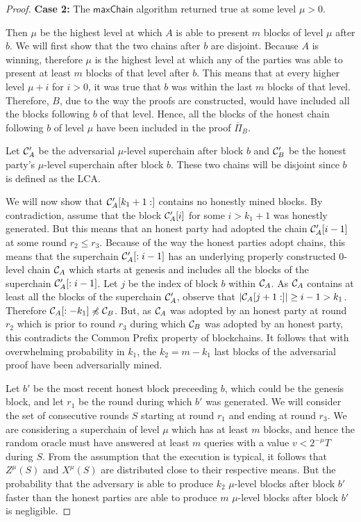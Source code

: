 \begin{proof}
    \textbf{Case 2:} The $\textsf{maxChain}$ algorithm returned true at some
    level $\mu > 0$.

    Then $\mu$ be the highest level at which $A$ is able to present $m$ blocks
    of level $\mu$ after $b$. We will first show that the two chains after $b$
    are disjoint. Because $A$ is winning, therefore $\mu$ is the highest level
    at which any of the parties was able to present at least $m$ blocks of that
    level after $b$.  This means that at every higher level $\mu + i$ for $i >
    0$, it was true that $b$ was within the last $m$ blocks of that level.
    Therefore, $B$, due to the way the proofs are constructed, would have
    included all the blocks following $b$ of that level. Hence, all the blocks
    of the honest chain following $b$ of level $\mu$ have been included in the
    proof $\overline{\Pi}_B$.

    Let $\mathcal{C}'_A$ be the adversarial $\mu$-level superchain after block $b$
    and $\mathcal{C}'_B$ be the honest party's $\mu$-level superchain after block
    $b$.  These two chains will be disjoint since $b$ is defined as the LCA.

    We will now show that $\mathcal{C}'_A[k_1 + 1:]$ contains no honestly mined
    blocks. By contradiction, assume that the block $\mathcal{C}'_A[i]$ for some $i
    > k_1 + 1$ was honestly generated. But this means that an honest party had
    adopted the chain $\mathcal{C}'_A[i - 1]$ at some round $r_2 \leq r_3$. Because
    of the way the honest parties adopt chains, this means that the superchain
    $\mathcal{C}'_A[:i - 1]$ has an underlying properly constructed $0$-level chain
    $\mathcal{C}_A$ which starts at genesis and includes all the blocks of the
    superchain $\mathcal{C}'_A[:i - 1]$. Let $j$ be the index of block $b$ within
    $\mathcal{C}_A$.  As $\mathcal{C}_A$ contains at least all the blocks of the
    superchain $\mathcal{C}'_A$, observe that $|\mathcal{C}_A[j + 1:]| \geq i - 1 > k_1$.
    Therefore $\mathcal{C}_A[:-k_1] \not\preccurlyeq \mathcal{C}_B$. But, as $\mathcal{C}_A$
    was adopted by an honest party at round $r_2$ which is prior to round $r_3$
    during which $\mathcal{C}_B$ was adopted by an honest party, this contradicts
    the Common Prefix property of blockchains. It follows that with
    overwhelming probability in $k_1$, the $k_2 = m - k_1$ last blocks of the
    adversarial proof have been adversarially mined.

    Let $b'$ be the most recent honest block preceeding $b$, which could be the
    genesis block, and let $r_1$ be the round during which $b'$ was generated.
    We will consider the set of consecutive rounds $S$ starting at round $r_1$
    and ending at round $r_3$. We are considering a superchain of level $\mu$
    which has at least $m$ blocks, and hence the random oracle must have
    answered at least $m$ queries with a value $v < 2^{-\mu}T$ during $S$. From
    the assumption that the execution is typical, it follows that $Z^\mu(S)$
    and $X^\mu(S)$ are distributed close to their respective means. But the
    probability that the adversary is able to produce $k_2$ $\mu$-level blocks
    after block $b'$ faster than the honest parties are able to produce $m$
    $\mu$-level blocks after block $b'$ is negligible.
\end{proof}
